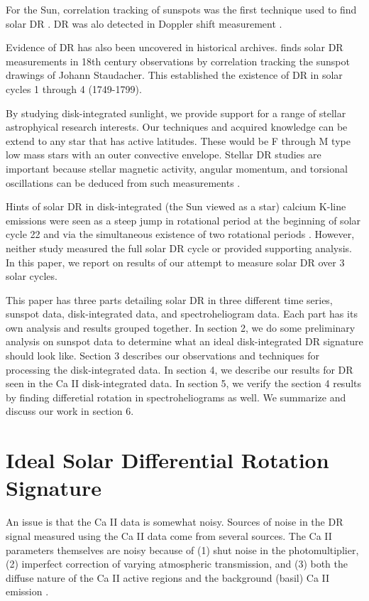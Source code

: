 \documentclass[preprint2]{aastex}
\begin{document}
For the Sun, correlation tracking of sunspots was the first technique used to find solar DR \citep{newt51}. DR was alo detected in Doppler shift measurement \citep{howa79}.

Evidence of DR has also been uncovered in historical archives. \cite{arlt12} finds solar DR measurements in 18th century observations by correlation tracking the sunspot drawings of Johann Staudacher. This established the existence of DR in solar cycles 1 through 4 (1749-1799).

By studying disk-integrated sunlight, we provide support for a range of stellar astrophyical research interests. Our techniques and acquired knowledge can be extend to any star that has active latitudes. These would be F through M type low mass stars with an outer convective envelope. Stellar DR studies are important because stellar magnetic activity, angular momentum, and torsional oscillations can be deduced from such measurements \citep{spru01}.

Hints of solar DR in disk-integrated (the Sun viewed as a star) calcium K-line emissions were seen as a steep jump in rotational period at the beginning of solar cycle 22 \citep{dona95} and via the simultaneous existence of two rotational periods \citep{hasl02}. However, neither study measured the full solar DR cycle or provided supporting analysis. In this paper, we report on results of our attempt to measure solar DR over 3 solar cycles.

This paper has three parts detailing solar DR in three different time series, sunspot data, disk-integrated data, and spectroheliogram data. Each part has its own analysis and results grouped together. In section 2, we do some preliminary analysis on sunspot data to determine what an ideal disk-integrated DR signature should look like. Section 3 describes our observations and techniques for processing the disk-integrated data. In section 4, we describe our results for DR seen in the Ca II disk-integrated data. In section 5, we verify the section 4 results by finding differetial rotation in spectroheliograms as well. We summarize and discuss our work in section 6.

\section{Ideal Solar Differential Rotation Signature}

An issue is that the Ca II data is somewhat noisy. Sources of noise in the DR signal measured using the Ca II data come from several sources. The Ca II parameters themselves are noisy because of (1) shut noise in the photomultiplier, (2) imperfect correction of varying atmospheric transmission, and (3) both the diffuse nature of the Ca II active regions and the background (basil) Ca II emission \citep{keil84}.
\end{document}
